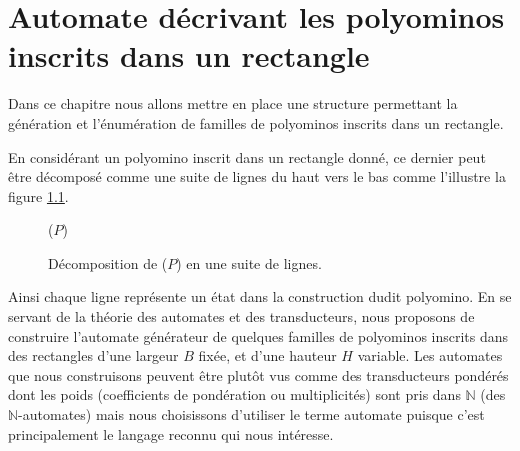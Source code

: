 
\chapter{Automate décrivant les polyominos inscrits dans un rectangle}
Dans ce chapitre nous allons mettre en place une structure permettant la génération et l'énumération de familles de polyominos  inscrits dans un rectangle.


 En considérant un polyomino inscrit dans un rectangle donné, ce dernier peut être décomposé comme une suite de lignes du haut vers le bas comme l'illustre  la figure \ref{Atfig1}.
\begin{figure}[!htb]
\begin{minipage}[c]{.46\linewidth}
        \centering
\end{minipage}\hfill
\begin{minipage}[c]{.23\linewidth}
        \centering
\begin{logicpuzzle}[rows=3,columns=3,color=cyan!100,width=750px,scale=0.5]
\framepuzzle[black!50]
\end{logicpuzzle}
($P$)\quad\quad\quad\quad\quad
\end{minipage}
\hfill
\begin{minipage}[c]{.32\linewidth}
 \centering
\begin{logicpuzzle}[rows=1,columns=3,color=cyan!100, width=750px,scale=0.5]
\framepuzzle[black!50]
\end{logicpuzzle}
\hfill
\begin{minipage}[c]{.95\linewidth}
 \centering
\begin{logicpuzzle}[rows=1,columns=3,color=cyan!100, width=750px,scale=0.5]
\framepuzzle[black!50]
\end{logicpuzzle}
\end{minipage}
\hfill
\begin{logicpuzzle}[rows=1,columns=3,color=cyan!100, width=750px,scale=0.5]
\framepuzzle[black!50]
\end{logicpuzzle}
\hfill
\end{minipage}
\hfill
\caption{\label{Atfig1} Décomposition de ($P$) en une suite de lignes.}
\end{figure}
Ainsi chaque ligne représente un état dans la construction dudit polyomino.
En se servant de la théorie des automates et des transducteurs, nous proposons de construire l'automate générateur de quelques familles de polyominos  inscrits dans des rectangles d'une largeur $B$ fixée, et d'une hauteur $H$ variable. Les automates que nous construisons  peuvent être plutôt vus comme des transducteurs pondérés dont les poids (coefficients de pondération ou multiplicités) sont pris dans $\mathbb{N}$ (des $\mathbb{N}$-automates) mais nous choisissons d'utiliser le terme automate puisque c'est  principalement le langage reconnu qui nous intéresse.

